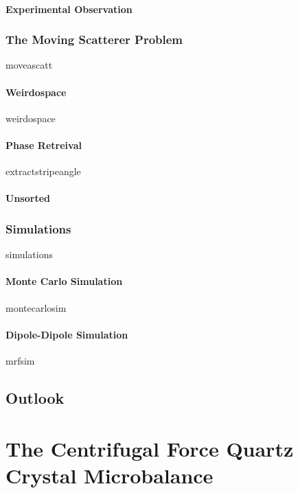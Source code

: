 \documentclass[12pt,a4paper,titlepage,onecolumn]{report}
\begin{document}
\subsection{Experimental Observation}
\section{The Moving Scatterer Problem}
{moveascatt}
\subsection{Weirdospace}
{weirdospace}
\subsection{Phase Retreival}
{extractstripeangle}
\subsection{Unsorted}
\section{Simulations}
{simulations}
\subsection{Monte Carlo Simulation} \label{sec:montecarlo}
{montecarlosim}
\subsection{Dipole-Dipole Simulation} \label{sec:mrfsim}
{mrfsim}
\chapter{Outlook} \label{ch:outlook}

\part{The Centrifugal Force Quartz Crystal Microbalance} \label{part:qcm}
\end{document}
